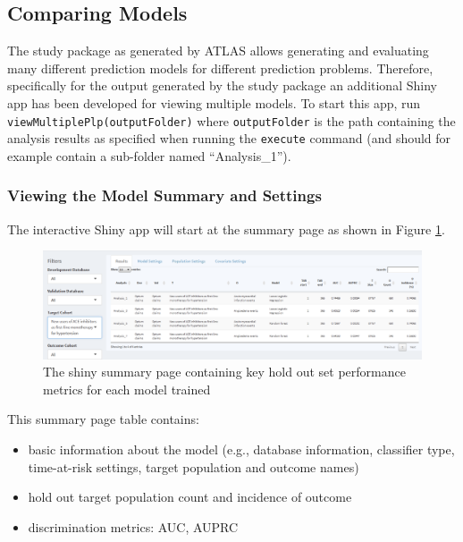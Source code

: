 \documentclass[11pt]{book}
\providecommand{\tightlist}{%
  \setlength{\itemsep}{0pt}\setlength{\parskip}{0pt}}
\theoremstyle{definition}
\theoremstyle{definition}
\theoremstyle{definition}
\theoremstyle{remark}
\begin{document}
\subsection{Comparing Models}\label{comparing-models}

The study package as generated by ATLAS allows generating and evaluating
many different prediction models for different prediction problems.
Therefore, specifically for the output generated by the study package an
additional Shiny app has been developed for viewing multiple models. To
start this app, run \texttt{viewMultiplePlp(outputFolder)} where
\texttt{outputFolder} is the path containing the analysis results as
specified when running the \texttt{execute} command (and should for
example contain a sub-folder named ``Analysis\_1'').

\subsubsection*{Viewing the Model Summary and
Settings}\label{viewing-the-model-summary-and-settings}

The interactive Shiny app will start at the summary page as shown in
Figure \ref{fig:multiShinySummary}.

\begin{figure}

{\centering \includegraphics[width=1\linewidth]{images/PatientLevelPrediction/shiny/shinyFilter} 

}

\caption{The shiny summary page containing key hold out set performance metrics for each model trained}\label{fig:multiShinySummary}
\end{figure}

This summary page table contains:

\begin{itemize}
\tightlist
\item
  basic information about the model (e.g., database information,
  classifier type, time-at-risk settings, target population and outcome
  names)
\item
  hold out target population count and incidence of outcome
\item
  discrimination metrics: AUC, AUPRC
\end{itemize}
\end{document}
